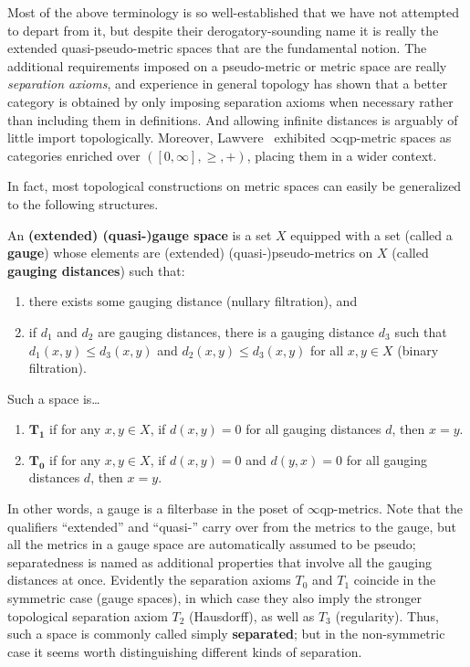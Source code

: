 \documentclass{article}
\def\Rp{[0,\infty]}
\def\eqp{$\infty$qp}
\begin{document}
Most of the above terminology is so well-established that we have not attempted to depart from it, but despite their derogatory-sounding name it is really the extended quasi-pseudo-metric spaces that are the fundamental notion.
The additional requirements imposed on a pseudo-metric or metric space are really \emph{separation axioms}, and experience in general topology has shown that a better category is obtained by only imposing separation axioms when necessary rather than including them in definitions.
And allowing infinite distances is arguably of little import topologically.
Moreover, Lawvere~\cite{lawvere:metric-spaces} exhibited \eqp-metric spaces as categories enriched over $(\Rp,\ge,+)$, placing them in a wider context.

In fact, most topological constructions on metric spaces can easily be generalized to the following structures.

\begin{defn}
  An \textbf{(extended) (quasi-)gauge space} is a set $X$ equipped with a set (called a \textbf{gauge}) whose elements are (extended) (quasi-)pseudo-metrics on $X$ (called \textbf{gauging distances}) such that:
  \begin{enumerate}
  \item there exists some gauging distance (nullary filtration), and
  \item if $d_1$ and $d_2$ are gauging distances, there is a gauging distance $d_3$ such that $d_1(x,y)\le d_3(x,y)$ and $d_2(x,y)\le d_3(x,y)$ for all $x,y\in X$ (binary filtration).
  \end{enumerate}
  Such a space is\dots
  \begin{enumerate}[resume]
  \item $\mathbf{T_1}$ if for any $x,y\in X$, if $d(x,y)=0$ for all gauging distances $d$, then $x=y$.
  \item $\mathbf{T_0}$ if for any $x,y\in X$, if $d(x,y)=0$ and $d(y,x)=0$ for all gauging distances $d$, then $x=y$.
  \end{enumerate}
\end{defn}

In other words, a gauge is a filterbase in the poset of \eqp-metrics.
Note that the qualifiers ``extended'' and ``quasi-'' carry over from the metrics to the gauge, but all the metrics in a gauge space are automatically assumed to be pseudo; separatedness is named as additional properties that involve all the gauging distances at once.
Evidently the separation axioms $T_0$ and $T_1$ coincide in the symmetric case (gauge spaces), in which case they also imply the stronger topological separation axiom $T_2$ (Hausdorff), as well as $T_3$ (regularity).
Thus, such a space is commonly called simply \textbf{separated}; but in the non-symmetric case it seems worth distinguishing different kinds of separation.
\end{document}
